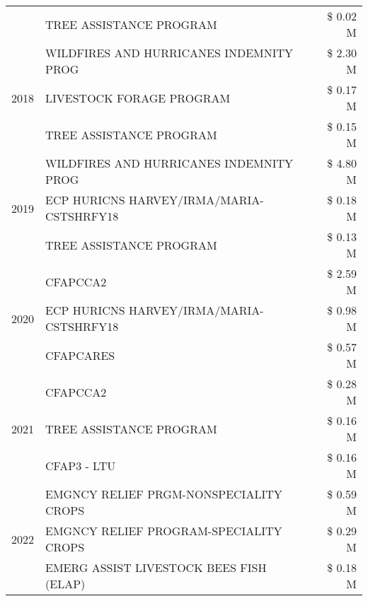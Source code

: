 \begin{tabular}{llr}
 & TREE ASSISTANCE PROGRAM & \$ 0.02 M \\
\cline{1-3}
\multirow[t]{3}{*}{2018} & WILDFIRES AND HURRICANES INDEMNITY PROG & \$ 2.30 M \\
 & LIVESTOCK FORAGE PROGRAM & \$ 0.17 M \\
 & TREE ASSISTANCE PROGRAM & \$ 0.15 M \\
\cline{1-3}
\multirow[t]{3}{*}{2019} & WILDFIRES AND HURRICANES INDEMNITY PROG & \$ 4.80 M \\
 & ECP HURICNS HARVEY/IRMA/MARIA-CSTSHRFY18 & \$ 0.18 M \\
 & TREE ASSISTANCE PROGRAM & \$ 0.13 M \\
\cline{1-3}
\multirow[t]{3}{*}{2020} & CFAPCCA2 & \$ 2.59 M \\
 & ECP HURICNS HARVEY/IRMA/MARIA-CSTSHRFY18 & \$ 0.98 M \\
 & CFAPCARES & \$ 0.57 M \\
\cline{1-3}
\multirow[t]{3}{*}{2021} & CFAPCCA2 & \$ 0.28 M \\
 & TREE ASSISTANCE PROGRAM & \$ 0.16 M \\
 & CFAP3 - LTU & \$ 0.16 M \\
\cline{1-3}
\multirow[t]{3}{*}{2022} & EMGNCY RELIEF PRGM-NONSPECIALITY CROPS & \$ 0.59 M \\
 & EMGNCY RELIEF PROGRAM-SPECIALITY CROPS & \$ 0.29 M \\
 & EMERG ASSIST LIVESTOCK BEES FISH (ELAP) & \$ 0.18 M \\
\cline{1-3}
\bottomrule
\end{tabular}
